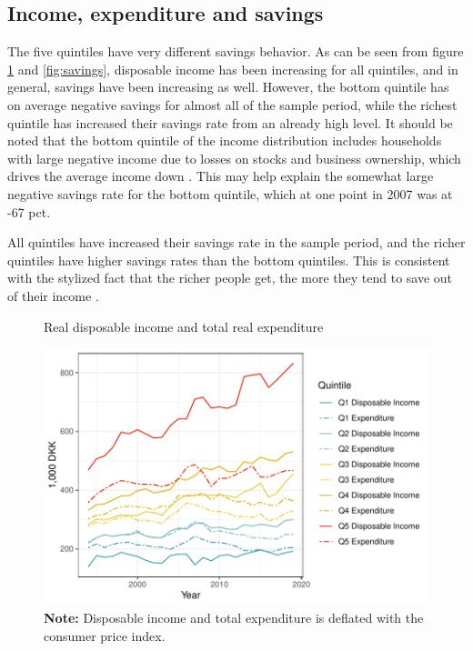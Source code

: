 \subsection{Income, expenditure and savings}
The five quintiles have very different savings behavior. As can be seen from figure \ref{fig:inccons} and \ref{fig:savings}, disposable income has been increasing for all quintiles, and in general, savings have been increasing as well. However, the bottom quintile has on average negative savings for almost all of the sample period, while the richest quintile has increased their savings rate from an already high level. It should be noted that the bottom quintile of the income distribution includes households with large negative income due to losses on stocks and business ownership, which drives the average income down \cite[IFOR32]{statbank}. This may help explain the somewhat large negative savings rate for the bottom quintile, which at one point in 2007 was at -67 pct. 

All quintiles have increased their savings rate in the sample period, and the richer quintiles have higher savings rates than the bottom quintiles. This is consistent with the stylized fact that the richer people get, the more they tend to save out of their income \citep{dynan2004rich}.
\begin{figure}[H]
\centering
\caption{Real disposable income and total real expenditure}
\label{fig:inccons}
\includegraphics[width=.8\textwidth]{Figures/forb_indk.pdf}
\captionsetup{singlelinecheck=off,size=scriptsize}
\setlength{\captionmargin}{10pt}
\caption*{
\textbf{Note:} Disposable income and total expenditure is deflated with the consumer price index. \citep[PRIS112]{statbank}}
\end{figure}

